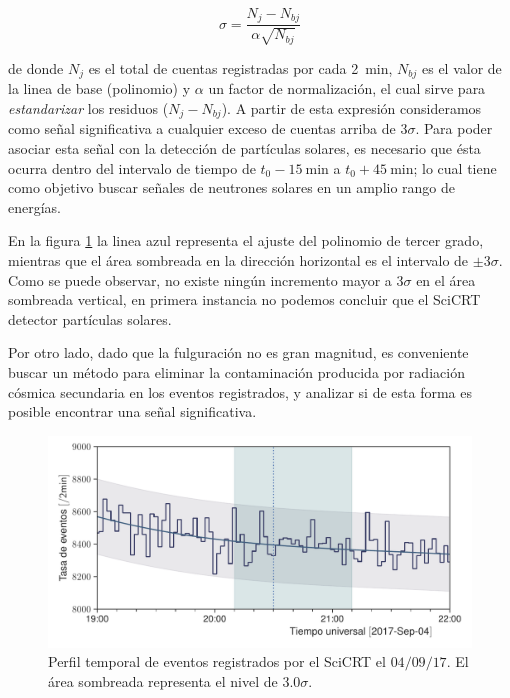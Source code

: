 \begin{equation}
\sigma=\frac{N_{j}-N_{bj}}{\alpha\sqrt{N_{bj}}}
\end{equation}

de donde $N_{j}$ es el total de cuentas registradas por cada \SI{2}{\minute}, $N_{bj}$ es el valor de la linea de base (polinomio) y $\alpha$ un factor de normalización, el cual sirve para \emph{estandarizar} los residuos ($N_{j}-N_{bj}$). A partir de esta expresión consideramos como señal significativa a cualquier exceso de cuentas arriba de $3\sigma$. Para poder asociar esta señal con la detección de partículas solares, es necesario que ésta ocurra dentro del intervalo de tiempo de $t_{0}-\SI{15}{\minute}$ a $t_{0}+\SI{45}{\minute}$; lo cual tiene como objetivo buscar señales de neutrones solares en un amplio rango de energías.

En la figura \ref{fig:september-04-neutrons} la linea azul representa el ajuste del polinomio de tercer grado, mientras que el área sombreada en la dirección horizontal es el intervalo de $\pm 3\sigma$. Como se puede observar, no existe ningún incremento mayor a $3\sigma$ en el área sombreada vertical, en primera instancia no podemos concluir que el SciCRT detector partículas solares.

Por otro lado, dado que la fulguración no es gran magnitud, es conveniente buscar un método para eliminar la contaminación producida por radiación cósmica secundaria en los eventos registrados, y analizar si de esta forma es posible encontrar una señal significativa.

\begin{figure}
        \centering
        \includegraphics[width=\textwidth]{neutron-170904.pdf}
        \caption{Perfil temporal de eventos registrados por el SciCRT el $04/09/17$. El área sombreada representa el nivel de $3.0\sigma$.}
        \label{fig:september-04-neutrons}
\end{figure}

